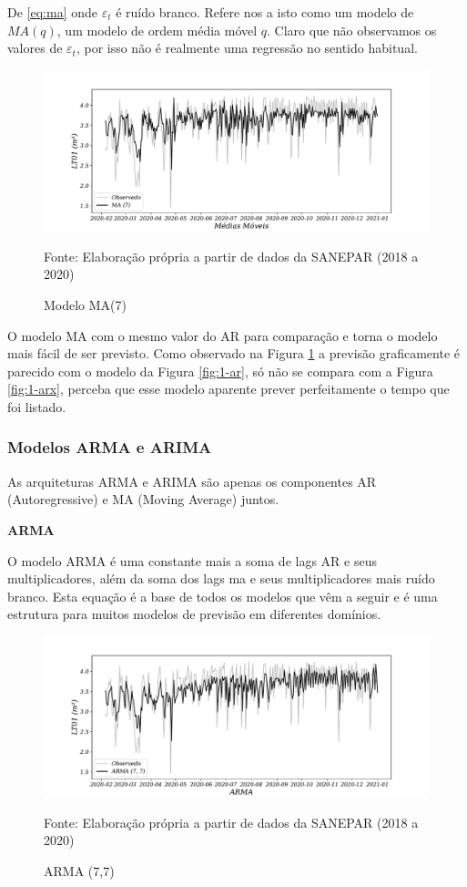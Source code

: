De \eqref{eq:ma} onde $\varepsilon_t$ é ruído branco. Refere nos a isto como um modelo de $MA(q)$, um modelo de ordem média móvel $q$. Claro que não observamos os valores de $\varepsilon_t$, por isso não é realmente uma regressão no sentido habitual.

\begin{figure}[H]
	\centering
	\caption{Modelo MA(7) }
	\label{fig:1-ma}
	\includegraphics[width=1\linewidth]{Modelos/Figuras/0-MA}
	
	Fonte: Elaboração própria a partir de dados da SANEPAR (2018 a 2020)
\end{figure}

O modelo MA com o mesmo valor do AR para comparação e torna o modelo mais fácil de ser previsto. Como observado na Figura \ref{fig:1-ma} a previsão graficamente é parecido com o modelo da Figura \ref{fig:1-ar}, só não se compara com a Figura \ref{fig:1-arx}, perceba que esse modelo aparente prever perfeitamente o tempo que foi listado.  

\subsubsection{Modelos ARMA e ARIMA}\label{subsubsec:arma}
As arquiteturas ARMA e ARIMA são apenas os componentes AR (Autoregressive) e MA (Moving Average) juntos.

\textbf{ARMA}

O modelo ARMA é uma constante mais a soma de lags AR e seus multiplicadores, além da soma dos lags ma e seus multiplicadores mais ruído branco. Esta equação é a base de todos os modelos que vêm a seguir e é uma estrutura para muitos modelos de previsão em diferentes domínios.

\begin{figure}[H]
	\centering
	\caption{ARMA (7,7)  }
	\label{fig:1-arma}
	\includegraphics[width=1\linewidth]{Modelos/Figuras/0-ARMA}
	
	Fonte: Elaboração própria a partir de dados da SANEPAR (2018 a 2020)
\end{figure}

